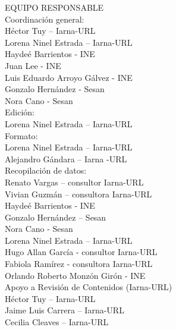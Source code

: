 $\ $
\vspace{1cm}

\begin{center}
	{\Bold \LARGE EQUIPO RESPONSABLE}\\[2cm]
	
	{\Bold \large \color{color1!89!black} Coordinación general:}\\[0.2cm]

Héctor Tuy – Iarna-URL\\
Lorena Ninel Estrada – Iarna-URL\\
Haydeé Barrientos - INE\\
Juan Lee - INE\\
Luis Eduardo Arroyo Gálvez - INE\\
Gonzalo Hernández - Sesan\\
Nora Cano - Sesan\\[0.8cm]

	{\Bold \large \color{color1!89!black} Edición:}\\[0.2cm]
Lorena Ninel Estrada – Iarna-URL\\[0.8cm]


	{\Bold \large \color{color1!89!black} Formato:}\\[0.2cm]

Lorena Ninel Estrada – Iarna-URL\\
Alejandro Gándara – Iarna -URL\\[0.8cm]

	{\Bold \large \color{color1!89!black} Recopilación de datos:}\\[0.2cm]
Renato Vargas – consultor Iarna-URL\\
Vivian Guzmán – consultora Iarna-URL\\
Haydeé Barrientos - INE\\
Gonzalo Hernández – Sesan\\
Nora Cano - Sesan\\
Lorena Ninel Estrada – Iarna-URL\\
Hugo Allan García - consultor Iarna-URL\\
Fabiola Ramírez - consultora Iarna-URL\\
Orlando Roberto Monzón Girón - INE\\[0.8cm]

	{\Bold \large \color{color1!89!black} Apoyo a Revisión de Contenidos (Iarna-URL)}\\[0.2cm]

Héctor Tuy – Iarna-URL\\
Jaime Luis Carrera – Iarna-URL\\
Cecilia Cleaves – Iarna-URL\\[0.8cm]
	
	
\end{center}\setcounter{page}{0}\cleardoublepage

